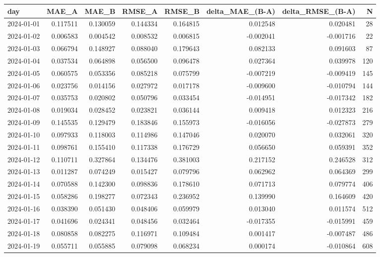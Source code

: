 \begin{tabular}{lrrrrrrr}
\toprule
day & MAE_A & MAE_B & RMSE_A & RMSE_B & delta_MAE_(B-A) & delta_RMSE_(B-A) & N \\
\midrule
2024-01-01 & 0.117511 & 0.130059 & 0.144334 & 0.164815 & 0.012548 & 0.020481 & 28 \\
2024-01-02 & 0.006583 & 0.004542 & 0.008532 & 0.006815 & -0.002041 & -0.001716 & 22 \\
2024-01-03 & 0.066794 & 0.148927 & 0.088040 & 0.179643 & 0.082133 & 0.091603 & 87 \\
2024-01-04 & 0.037534 & 0.064898 & 0.056500 & 0.096478 & 0.027364 & 0.039978 & 120 \\
2024-01-05 & 0.060575 & 0.053356 & 0.085218 & 0.075799 & -0.007219 & -0.009419 & 145 \\
2024-01-06 & 0.023756 & 0.014156 & 0.027972 & 0.017178 & -0.009600 & -0.010794 & 144 \\
2024-01-07 & 0.035753 & 0.020802 & 0.050796 & 0.033454 & -0.014951 & -0.017342 & 182 \\
2024-01-08 & 0.019034 & 0.028452 & 0.023821 & 0.036144 & 0.009418 & 0.012323 & 216 \\
2024-01-09 & 0.145535 & 0.129479 & 0.183846 & 0.155973 & -0.016056 & -0.027873 & 279 \\
2024-01-10 & 0.097933 & 0.118003 & 0.114986 & 0.147046 & 0.020070 & 0.032061 & 320 \\
2024-01-11 & 0.098761 & 0.155410 & 0.117338 & 0.176729 & 0.056650 & 0.059391 & 352 \\
2024-01-12 & 0.110711 & 0.327864 & 0.134476 & 0.381003 & 0.217152 & 0.246528 & 312 \\
2024-01-13 & 0.011287 & 0.074249 & 0.015427 & 0.079796 & 0.062962 & 0.064369 & 299 \\
2024-01-14 & 0.070588 & 0.142300 & 0.098836 & 0.178610 & 0.071713 & 0.079774 & 406 \\
2024-01-15 & 0.058286 & 0.198277 & 0.072343 & 0.236952 & 0.139990 & 0.164609 & 420 \\
2024-01-16 & 0.038390 & 0.051430 & 0.048406 & 0.059979 & 0.013040 & 0.011574 & 512 \\
2024-01-17 & 0.041696 & 0.024341 & 0.048456 & 0.032464 & -0.017355 & -0.015991 & 459 \\
2024-01-18 & 0.080858 & 0.082275 & 0.116971 & 0.109484 & 0.001417 & -0.007487 & 486 \\
2024-01-19 & 0.055711 & 0.055885 & 0.079098 & 0.068234 & 0.000174 & -0.010864 & 608 \\

\end{tabular}
